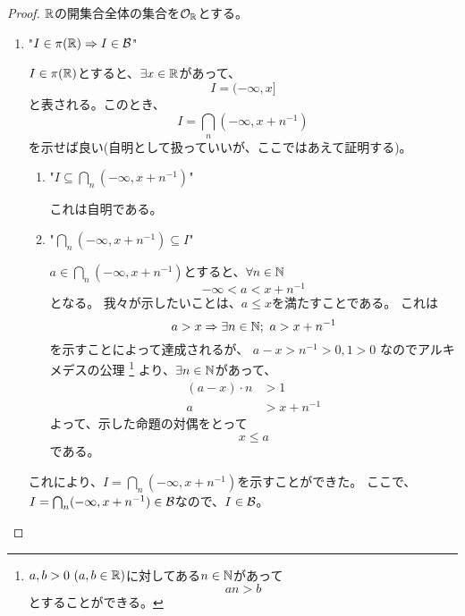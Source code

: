         \begin{proof}
            ${\mathbb{R}}$の開集合全体の集合を$\mathcal{O}_{{\mathbb{R}}}$とする。
            \begin{enumerate}[font = \bfseries, label = step \arabic*.]
                \item "$I\in\pi({\mathbb{R}})\Rightarrow I\in {\mathcal{B}}$"\par
                    $I\in\pi({\mathbb{R}})$とすると、$\exists x\in{\mathbb{R}}$があって、
                    \[
                        I = (-\infty, x]
                    \]
                    と表される。このとき、
                    \[
                        I = \bigcap_{n} (-\infty, x + n^{-1})
                    \]
                    を示せば良い(自明として扱っていいが、ここではあえて証明する)。
                    \begin{enumerate}
                        \item "$I\subseteq \bigcap_{n} (-\infty, x + n^{-1})$"\par
                            これは自明である。
                        \item "$\bigcap_{n} (-\infty, x + n^{-1})\subseteq I$"\par
                            $a\in\bigcap_{n} (-\infty, x + n^{-1})$とすると、$\forall n\in{\mathbb{N}}$
                            \[
                                -\infty<a<x + n^{-1}
                            \]
                            となる。
                            我々が示したいことは、$a\leq x$を満たすことである。
                            これは
                            \[
                                a > x \Rightarrow \exists n \in {\mathbb{N}};\ a > x + n^{-1}
                            \]
                            を示すことによって達成されるが、
                            $a-x > n^{-1} > 0, 1 > 0$
                            なのでアルキメデスの公理
                            \footnote{
                                $a, b > 0\ (a, b\in {\mathbb{R}})$に対してある$n\in{\mathbb{N}}$があって
                                \[
                                    an > b
                                \]
                                とすることができる。
                            }
                            より、$\exists n \in {\mathbb{N}}$があって、
                            \begin{align*}
                                (a-x)\cdot n &> 1\\
                                a &> x + n^{-1}
                            \end{align*}
                            よって、示した命題の対偶をとって
                            \[
                                x \leq a
                            \]
                            である。
                    \end{enumerate}
                    これにより、$I = \bigcap_{n} (-\infty, x + n^{-1})$を示すことができた。
                    ここで、$I = \bigcap_{n} (-\infty, x + n^{-1}) \in {\mathcal{B}}$なので、$I\in{\mathcal{B}}$。
    

\end{enumerate}
\end{proof}
